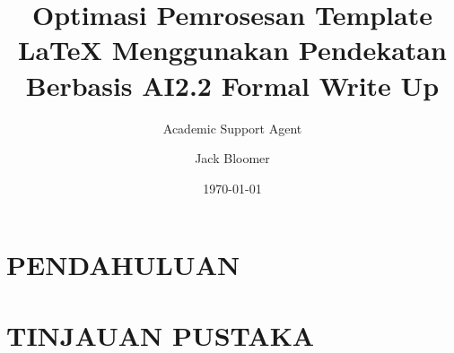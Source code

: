 \documentclass{article}
\title{Optimasi Pemrosesan Template LaTeX Menggunakan Pendekatan Berbasis AI}
\author{Academic Support Agent}
\date{\today}
\begin{document}
\maketitle

\begin{abstract}

\end{abstract}

\chapter{PENDAHULUAN}


\chapter{TINJAUAN PUSTAKA}



\usepackage[english]{babel}
\usepackage[utf8x]{inputenc}
\usepackage{amsmath}
\usepackage{graphicx}
\usepackage[colorinlistoftodos]{todonotes}

\title{2.2 Formal Write Up}
\author{Jack Bloomer}
\end{document}
